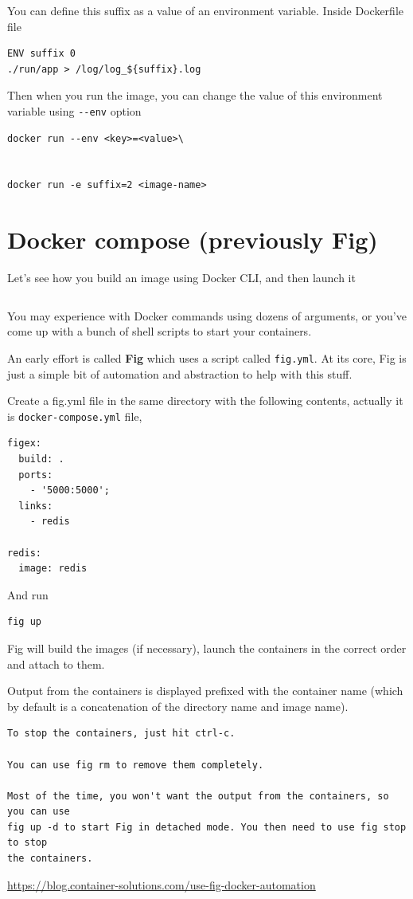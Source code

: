 You can define this suffix as a value of an environment variable. Inside Dockerfile file
\begin{verbatim}
ENV suffix 0
./run/app > /log/log_${suffix}.log
\end{verbatim}
Then when you run the image, you can change the value of this environment variable using 
\verb!--env! option
\begin{verbatim}
docker run --env <key>=<value>\


docker run -e suffix=2 <image-name>
\end{verbatim}



\section{Docker compose (previously Fig)}


Let's see how you build an image using Docker CLI, and then launch it
\begin{verbatim}

\end{verbatim}

You may experience with Docker commands using dozens of arguments, or you've
come up with a bunch of shell scripts to start your containers.

\begin{mdframed}

An early effort is called {\bf Fig} which uses a script called \verb!fig.yml!.
At its core, Fig is just a simple bit of automation and abstraction to help with this stuff.

Create a fig.yml file in the same directory with the following contents, actually it is
 \verb!docker-compose.yml! file, 
\begin{verbatim}
figex:
  build: .
  ports:
    - '5000:5000';
  links:
    - redis
 
redis:
  image: redis
\end{verbatim}
And run 
\begin{verbatim}
fig up 
\end{verbatim}
Fig will build the images (if necessary), launch the containers in the correct order and attach to them.

Output from the containers is displayed prefixed with the container name (which by default is a concatenation of the directory name and image name).
\begin{verbatim}
To stop the containers, just hit ctrl-c. 

You can use fig rm to remove them completely. 

Most of the time, you won't want the output from the containers, so you can use
fig up -d to start Fig in detached mode. You then need to use fig stop to stop
the containers.

\end{verbatim}
\url{https://blog.container-solutions.com/use-fig-docker-automation}
\end{mdframed}

